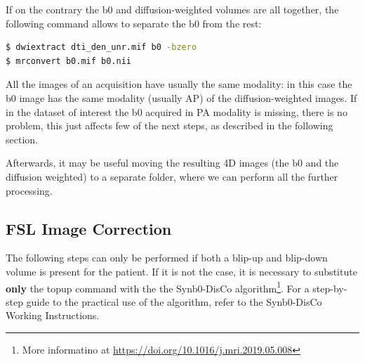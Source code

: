 \documentclass[a4paper,11pt]{article}
\begin{document}
If on the contrary the b0 and diffusion-weighted volumes are all together, the following command allows to separate the b0 from the rest:
\begin{lstlisting}[language=bash]
$ dwiextract dti_den_unr.mif b0 -bzero  
$ mrconvert b0.mif b0.nii
\end{lstlisting}
All the images of an acquisition have usually the same modality: in this case the b0 image has the same modality (usually AP) of the diffusion-weighted images. If in the dataset of interest the b0 acquired in PA modality is missing, there is no problem, this just affects few of the next steps, as described in the following section.

Afterwards, it may be useful moving the resulting 4D images (the b0 and the diffusion weighted) to a separate folder, where we can perform all the further processing. 


\subsection{FSL Image Correction}

The following steps can only be performed if both a blip-up and blip-down volume is present for the patient. If it is not the case, it is necessary to substitute \textbf{only} the topup command with the the Synb0-DisCo algorithm\footnote{More informatino at \url{https://doi.org/10.1016/j.mri.2019.05.008}}. For a step-by-step guide to the practical use of the algorithm, refer to the Synb0-DisCo Working Instructions.
\end{document}

